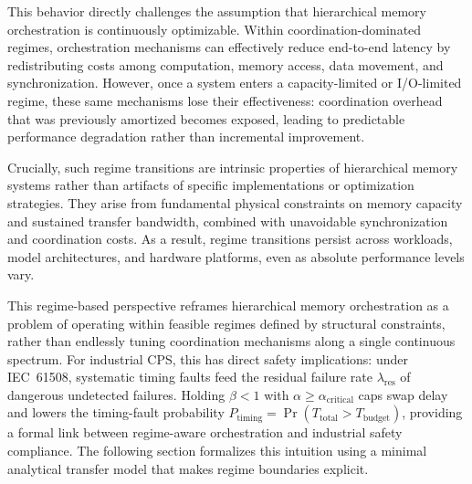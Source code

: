 This behavior directly challenges the assumption that hierarchical memory orchestration is continuously optimizable. Within coordination-dominated regimes, orchestration mechanisms can effectively reduce end-to-end latency by redistributing costs among computation, memory access, data movement, and synchronization. However, once a system enters a capacity-limited or I/O-limited regime, these same mechanisms lose their effectiveness: coordination overhead that was previously amortized becomes exposed, leading to predictable performance degradation rather than incremental improvement.

Crucially, such regime transitions are intrinsic properties of hierarchical memory systems rather than artifacts of specific implementations or optimization strategies. They arise from fundamental physical constraints on memory capacity and sustained transfer bandwidth, combined with unavoidable synchronization and coordination costs. As a result, regime transitions persist across workloads, model architectures, and hardware platforms, even as absolute performance levels vary.

This regime-based perspective reframes hierarchical memory orchestration as a problem of operating within feasible regimes defined by structural constraints, rather than endlessly tuning coordination mechanisms along a single continuous spectrum.
For industrial CPS, this has direct safety implications: under IEC~61508, systematic timing faults feed the residual failure rate $\lambda_{\mathrm{res}}$ of dangerous undetected failures. Holding $\beta < 1$ with $\alpha \geq \alpha_{\mathrm{critical}}$ caps swap delay and lowers the timing-fault probability $P_{\mathrm{timing}} = \Pr(T_{\mathrm{total}} > T_{\mathrm{budget}})$, providing a formal link between regime-aware orchestration and industrial safety compliance.
The following section formalizes this intuition using a minimal analytical transfer model that makes regime boundaries explicit.


\FloatBarrier